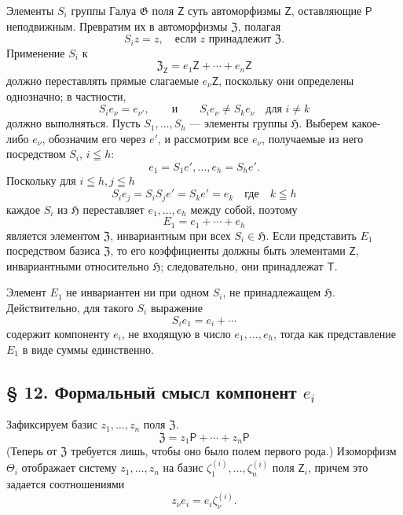\documentclass[11pt]{article}
\begin{document}
Элементы \(S_i\) группы Галуа \(\mathfrak G\) поля \(\mathsf Z\) суть автоморфизмы \(\mathsf Z\), оставляющие \(\mathsf P\) неподвижным. Превратим их в автоморфизмы \(\mathfrak Z\), полагая
\[
S_i z=z,\quad \text{если } z \text{ принадлежит } \mathfrak Z.
\]
Применение \(S_i\) к
\[
\mathfrak Z_{\mathsf Z}=e_1\mathsf Z+\cdots+e_n\mathsf Z
\]
должно переставлять прямые слагаемые \(e_\nu\mathsf Z\), поскольку они определены однозначно; в частности,
\[
S_i e_\nu=e_{\nu'},\qquad\text{и}\qquad S_i e_\nu\ne S_k e_\nu
\quad\text{для } i\ne k
\]
должно выполняться. Пусть \(S_1,\ldots,S_h\) --- элементы группы \(\mathfrak H\). Выберем какое-либо \(e_\nu\), обозначим его через \(e'\), и рассмотрим все \(e_\nu\), получаемые из него посредством \(S_i\), \(i\leqq h\):
\[
e_1=S_1e',\ldots,e_h=S_he'.
\]
Поскольку для \(i\leqq h, j\leqq h\)
\[
S_i e_j=S_iS_j e'=S_ke'=e_k \quad \text{где}\quad k\leqq h
\]
каждое \(S_i\) из \(\mathfrak H\) переставляет \(e_1,\ldots,e_h\) между собой, поэтому
\[
E_1=e_1+\cdots+e_h
\]
является элементом \(\mathfrak Z\), инвариантным при всех \(S_i\in\mathfrak H\). Если представить \(E_1\) посредством базиса \(\mathfrak Z\), то его коэффициенты должны быть элементами \(\mathsf Z\), инвариантными относительно \(\mathfrak H\); следовательно, они принадлежат \(\mathsf T\).

Элемент \(E_1\) не инвариантен ни при одном \(S_i\), не принадлежащем \(\mathfrak H\). Действительно, для такого \(S_i\) выражение
\[
S_i e_1=e_i+\cdots
\]
содержит компоненту \(e_i\), не входящую в число \(e_1,\ldots,e_h\), тогда как представление \(E_1\) в виде суммы единственно.

\subsection*{§ 12. Формальный смысл компонент \(e_i\)}\label{die-formale-bedeutung-der-komponenten-ei}

Зафиксируем базис \(z_1,\ldots,z_n\) поля \(\mathfrak Z\).
\[
\mathfrak Z=z_1\mathsf P+\cdots+z_n\mathsf P
\]
(Теперь от \(\mathfrak Z\) требуется лишь, чтобы оно было полем первого рода.) Изоморфизм \(\Theta_i\) отображает систему \(z_1,\ldots,z_n\) на базис \(\zeta_1^{(i)},\ldots,\zeta_n^{(i)}\) поля \(\mathsf Z_i\), причем это задается соотношениями
\[
z_\nu e_i=e_i\zeta_\nu^{(i)} .
\]
\end{document}
